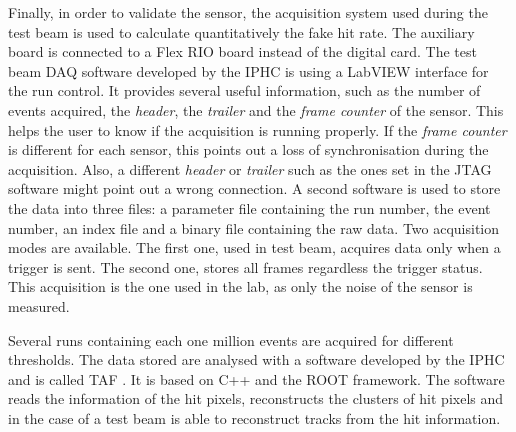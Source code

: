   Finally, in order to validate the sensor, the acquisition system used during the test beam is used to calculate quantitatively the fake hit rate.
  The auxiliary board is connected to a  Flex RIO board instead of the digital card.
  The test beam DAQ software developed by the IPHC is using a LabVIEW interface for the run control.
  It provides several useful information, such as the number of events acquired, the \textit{header}, the \textit{trailer} and the \textit{frame counter} of the sensor.
  This helps the user to know if the acquisition is running properly.
  If the \textit{frame counter} is different for each sensor, this points out a loss of synchronisation during the acquisition.
  Also, a different \textit{header} or \textit{trailer} such as the ones set in the JTAG software might point out a wrong connection.
  A second software is used to store the data into three files: a parameter file containing the run number, the event number, an index file and a binary file containing the raw data.
  Two acquisition modes are available. 
  The first one, used in test beam, acquires data only when a trigger is sent.
  The second one, stores all frames regardless the trigger status. 
  This acquisition is the one used in the lab, as only the noise of the sensor is measured.
   
  Several runs containing each one million events are acquired for different thresholds. 
  The data stored are analysed with a software developed by the IPHC and is called \gls{TAF} \cite{TAF2015}.
  It is based on C++ and the ROOT framework.
  The software reads the information of the hit pixels, reconstructs the clusters of hit pixels and in the case of a test beam is able to reconstruct tracks from the hit information.

